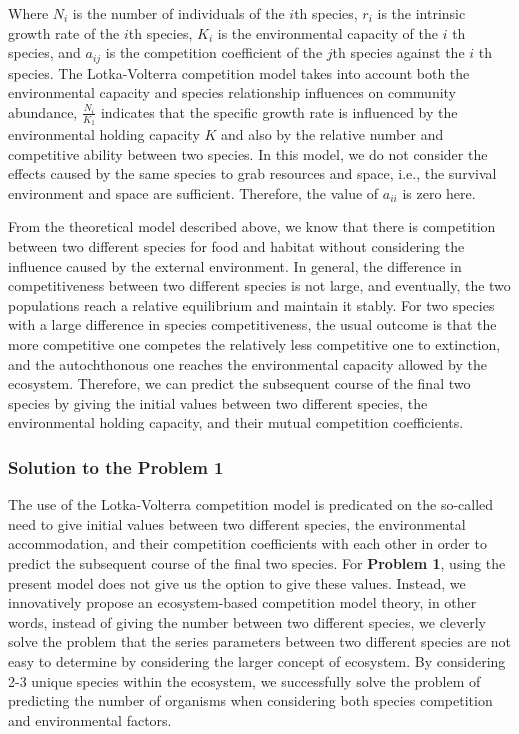 \documentclass[12pt]{article}
\begin{document}
Where $N_i$ is the number of individuals of the $i$th species, $r_i$ is the intrinsic growth rate of the $i$th species, $K_i$ is the environmental capacity of the $i$ th species, and $a_{ij}$ is the competition coefficient of the $j$th species against the $i$ th species. The Lotka-Volterra competition model takes into account both the environmental capacity and species relationship influences on community abundance, $\frac{N_i}{K_1}$ indicates that the specific growth rate is influenced by the environmental holding capacity $K$ and also by the relative number and competitive ability between two species. In this model, we do not consider the effects caused by the same species to grab resources and space, i.e., the survival environment and space are sufficient. Therefore, the value of $a_{ii}$ is zero here.

From the theoretical model described above, we know that there is competition between two different species for food and habitat without considering the influence caused by the external environment. In general, the difference in competitiveness between two different species is not large, and eventually, the two populations reach a relative equilibrium and maintain it stably. For two species with a large difference in species competitiveness, the usual outcome is that the more competitive one competes the relatively less competitive one to extinction, and the autochthonous one reaches the environmental capacity allowed by the ecosystem. Therefore, we can predict the subsequent course of the final two species by giving the initial values between two different species, the environmental holding capacity, and their mutual competition coefficients.

\subsubsection{Solution to the Problem 1}

The use of the Lotka-Volterra competition model is predicated on the so-called need to give initial values between two different species, the environmental accommodation, and their competition coefficients with each other in order to predict the subsequent course of the final two species. For \textbf{Problem 1}, using the present model does not give us the option to give these values. Instead, we innovatively propose an ecosystem-based competition model theory, in other words, instead of giving the number between two different species, we cleverly solve the problem that the series parameters between two different species are not easy to determine by considering the larger concept of ecosystem. By considering 2-3 unique species within the ecosystem, we successfully solve the problem of predicting the number of organisms when considering both species competition and environmental factors.
\end{document}
